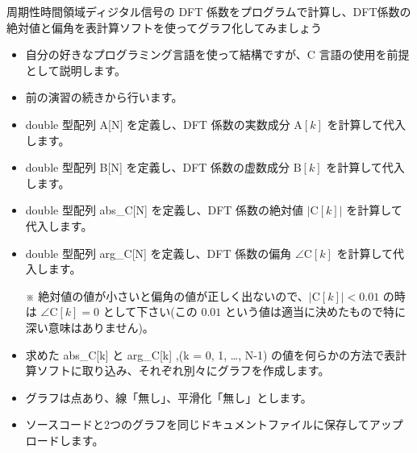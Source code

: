 \documentclass[a4paper]{jarticle}
\begin{document}
 周期性時間領域ディジタル信号の DFT 係数をプログラムで計算し、DFT係数の絶対値と偏角を表計算ソフトを使ってグラフ化してみましょう  \par
\par\vspace{1zh}
\begin{itemize}
\item 自分の好きなプログラミング言語を使って結構ですが、C 言語の使用を前提として説明します。
\item 前の演習の続きから行います。
\item double 型配列 A[N] を定義し、DFT 係数の実数成分 $\textrm{A}[k]$ を計算して代入します。
\item double 型配列 B[N] を定義し、DFT 係数の虚数成分 $\textrm{B}[k]$ を計算して代入します。
\item double 型配列 abs\_C[N] を定義し、DFT 係数の絶対値 $|\textrm{C}[k]|$ を計算して代入します。
\item double 型配列 arg\_C[N] を定義し、DFT 係数の偏角 $\angle\textrm{C}[k]$ を計算して代入します。\par
 ※  絶対値の値が小さいと偏角の値が正しく出ないので、$|\textrm{C}[k]| < 0.01$ の時は $\angle\textrm{C}[k] = 0$ として下さい(この $0.01$ という値は適当に決めたもので特に深い意味はありません)。\par
\item 求めた abs\_C[k] と arg\_C[k] ,(k = 0, 1,  …, N-1) の値を何らかの方法で表計算ソフトに取り込み、それぞれ別々にグラフを作成します。
\item グラフは点あり、線「無し」、平滑化「無し」とします。
\item ソースコードと2つのグラフを同じドキュメントファイルに保存してアップロードします。
\end{itemize}

\savepractime
\end{document}
